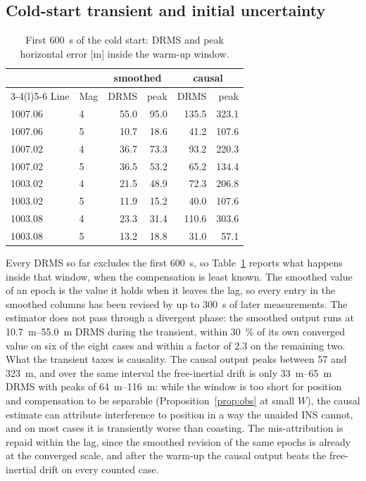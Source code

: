 \documentclass{IEEEtaes}
\begin{document}
\subsection{Cold-start transient and initial uncertainty}\label{sec:transient}

\begin{table}[t]
\caption{First \SI{600}{\second} of the cold start: DRMS and peak horizontal
error [m] inside the warm-up window.}
\label{tab:transient}
\centering
\setlength{\tabcolsep}{4pt}
\begin{tabular}{ll rr rr}
\toprule
 & & \multicolumn{2}{c}{smoothed} & \multicolumn{2}{c}{causal} \\
\cmidrule(lr){3-4}\cmidrule(l){5-6}
Line & Mag & DRMS & peak & DRMS & peak \\
\midrule
1007.06 & 4 & 55.0 & 95.0 & 135.5 & 323.1 \\
1007.06 & 5 & 10.7 & 18.6 & 41.2 & 107.6 \\
1007.02 & 4 & 36.7 & 73.3 & 93.2 & 220.3 \\
1007.02 & 5 & 36.5 & 53.2 & 65.2 & 134.4 \\
1003.02 & 4 & 21.5 & 48.9 & 72.3 & 206.8 \\
1003.02 & 5 & 11.9 & 15.2 & 40.0 & 107.6 \\
1003.08 & 4 & 23.3 & 31.4 & 110.6 & 303.6 \\
1003.08 & 5 & 13.2 & 18.8 & 31.0 & 57.1 \\
\bottomrule
\end{tabular}
\end{table}

Every DRMS so far excludes the first \SI{600}{\second}, so Table~\ref{tab:transient}
reports what happens inside that window, when the compensation is least
known. The smoothed value of an epoch is the value it holds when it leaves
the lag, so every entry in the smoothed columns has been revised by up to
\SI{300}{\second} of later measurements. The estimator does not pass through
a divergent phase: the smoothed output runs at \SIrange{10.7}{55.0}{\meter}
DRMS during the transient, within \SI{30}{\percent} of its own converged
value on six of the eight cases and within a factor of \num{2.3} on the
remaining two. What the transient taxes is causality. The causal output
peaks between \SI{57}{} and \SI{323}{\meter}, and over the same interval the
free-inertial drift is only \SIrange{33}{65}{\meter} DRMS with peaks of
\SIrange{64}{116}{\meter}: while the window is too short for position and
compensation to be separable (Proposition~\ref{prop:obs} at small $W$), the
causal estimate can attribute interference to position in a way the unaided
INS cannot, and on most cases it is transiently worse than coasting. The
mis-attribution is repaid within the lag, since the smoothed revision of the
same epochs is already at the converged scale, and after the warm-up the
causal output beats the free-inertial drift on every counted case.
\end{document}
